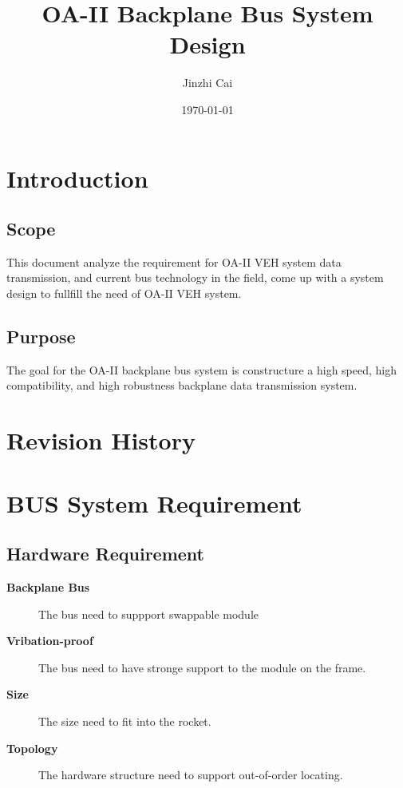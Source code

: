 \documentclass[12pt,article]{memoir}
\title{OA-II Backplane Bus System Design}
\author{Jinzhi Cai}
\date{\today}
\begin{document}
	


\tableofcontents*
\clearpage



\chapter{Introduction}
\section{Scope}
This document analyze the requirement for OA-II VEH system data transmission, and current bus technology in the field, come up with a system design to fullfill the need of OA-II VEH system.
\section{Purpose}
The goal for the OA-II backplane bus system is constructure a high speed, high compatibility, and high robustness backplane data transmission system.
\chapter{Revision History}
\begin{table}[H]
	\centering
	\caption{Summary of Revision History}
	\label{tab:rev}
\end{table}
\newpage
\chapter{BUS System Requirement}
\section{Hardware Requirement}
\begin{description}
	\item[\textbf{Backplane Bus}]The bus need to suppport swappable module
	\item[\textbf{Vribation-proof}]The bus need to have stronge support to the module on the frame.
	\item[\textbf{Size}]The size need to fit into the rocket.
	\item[\textbf{Topology}]The hardware structure need to support out-of-order locating.
\end{description}
\end{document}
